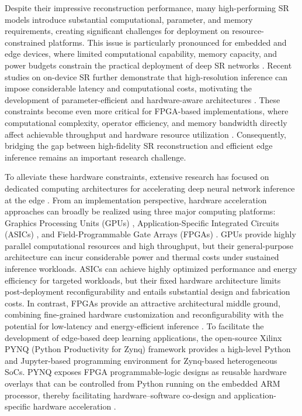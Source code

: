 \documentclass[conference]{IEEEtran}
\begin{document}
Despite their impressive reconstruction performance, many high-performing SR models introduce substantial computational, parameter, and memory requirements, creating significant challenges for deployment on resource-constrained platforms. This issue is particularly pronounced for embedded and edge devices, where limited computational capability, memory capacity, and power budgets constrain the practical deployment of deep SR networks \cite{wang2023lightweight, xiao2022mfen}. Recent studies on on-device SR further demonstrate that high-resolution inference can impose considerable latency and computational costs, motivating the development of parameter-efficient and hardware-aware architectures \cite{hadji2025edge}. These constraints become even more critical for FPGA-based implementations, where computational complexity, operator efficiency, and memory bandwidth directly affect achievable throughput and hardware resource utilization \cite{huang2026uasr}. Consequently, bridging the gap between high-fidelity SR reconstruction and efficient edge inference remains an important research challenge.

To alleviate these hardware constraints, extensive research has focused on dedicated computing architectures for accelerating deep neural network inference at the edge \cite{sze2017efficient}. From an implementation perspective, hardware acceleration approaches can broadly be realized using three major computing platforms: Graphics Processing Units (GPUs) \cite{krizhevsky2012imagenet}, Application-Specific Integrated Circuits (ASICs) \cite{jouppi2017datacenter}, and Field-Programmable Gate Arrays (FPGAs) \cite{mittal2020survey}. GPUs provide highly parallel computational resources and high throughput, but their general-purpose architecture can incur considerable power and thermal costs under sustained inference workloads. ASICs can achieve highly optimized performance and energy efficiency for targeted workloads, but their fixed hardware architecture limits post-deployment reconfigurability and entails substantial design and fabrication costs. In contrast, FPGAs provide an attractive architectural middle ground, combining fine-grained hardware customization and reconfigurability with the potential for low-latency and energy-efficient inference \cite{sze2017efficient, mittal2020survey}. To facilitate the development of edge-based deep learning applications, the open-source Xilinx PYNQ (Python Productivity for Zynq) framework provides a high-level Python and Jupyter-based programming environment for Zynq-based heterogeneous SoCs. PYNQ exposes FPGA programmable-logic designs as reusable hardware overlays that can be controlled from Python running on the embedded ARM processor, thereby facilitating hardware--software co-design and application-specific hardware acceleration \cite{pynqhomepage, kalapothas2022efficient}.
\end{document}
